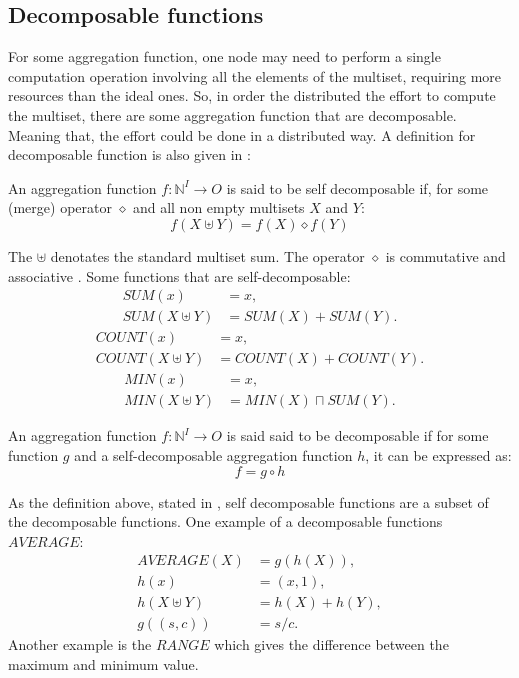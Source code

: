\subsection {Decomposable functions}
For some aggregation function, one node may need to perform a single computation operation involving all the elements of the multiset, requiring more resources than the ideal ones. So, in order the distributed the effort to compute the multiset, there are some aggregation function that are decomposable. Meaning that, the effort could be done in a distributed way. A definition for decomposable function is also given in \cite{journals/corr/abs-1110-0725}:
\begin{definition} An aggregation function $ f : \mathbb{N}^I \to O$ is said to be self decomposable if, for some (merge) operator $\diamond$ and all non empty multisets $X$ and $Y$:
\begin{equation*}f(X \uplus Y) = f(X) \diamond f(Y) \end{equation*}
\end{definition}
The $\uplus$ denotates the standard multiset sum. The operator $\diamond$ is commutative and associative \cite{journals/corr/abs-1110-0725}. Some functions that are self-decomposable:
\begin{align*}SUM ({x}) &= x,\\
SUM(X \uplus Y) &= SUM(X)+SUM(Y).\end{align*}
\begin{align*}COUNT ({x}) &= x,  \\
COUNT(X \uplus Y)& = COUNT(X)+COUNT(Y).\end{align*}
\begin{align*}MIN ({x}) &= x,\\
MIN(X \uplus Y) &= MIN(X) \sqcap SUM(Y).\end{align*}
\begin{definition}
An aggregation function $ f : \mathbb{N}^I \to O$ is said said to be decomposable if for some function $g$ and a self-decomposable aggregation function $h$, it can be expressed as:
\begin{equation*}f=g \circ h\end{equation*}
\end{definition}
As the definition above, stated in \cite{journals/corr/abs-1110-0725}, self decomposable functions are a subset of the decomposable functions. One example of a decomposable functions $AVERAGE$:
\begin{align*} 
AVERAGE(X) &= g(h(X)),\\
h({x}) &= (x,1),\\
h(X \uplus Y) &= h(X) + h(Y),\\
g((s,c)) &= s/c. \end{align*}
Another example is the $RANGE$ which gives the difference between the maximum and minimum value.


